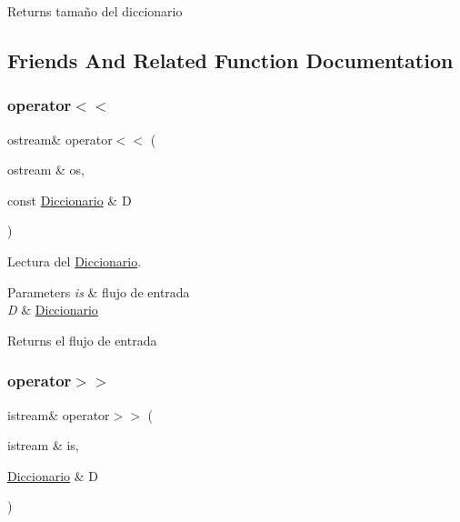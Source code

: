 \begin{DoxyReturn}{Returns}
tamaño del diccionario 
\end{DoxyReturn}


\subsection{Friends And Related Function Documentation}
\mbox{\label{classDiccionario_aad8d25118e38f63c35cfc247af45a78a}} 
\subsubsection{\texorpdfstring{operator$<$$<$}{operator<<}}
{\footnotesize\ttfamily ostream\& operator$<$$<$ (\begin{DoxyParamCaption}\item[{ostream \&}]{os,  }\item[{const \mbox{\hyperlink{classDiccionario}{Diccionario}} \&}]{D }\end{DoxyParamCaption})\hspace{0.3cm}{\ttfamily [friend]}}



Lectura del \mbox{\hyperlink{classDiccionario}{Diccionario}}. 


\begin{DoxyParams}{Parameters}
{\em is} & flujo de entrada \\
\hline
{\em D} & \mbox{\hyperlink{classDiccionario}{Diccionario}} \\
\hline
\end{DoxyParams}
\begin{DoxyReturn}{Returns}
el flujo de entrada 
\end{DoxyReturn}
\mbox{\label{classDiccionario_a940c6d9371bca891c95a5a044a42905f}} 
\subsubsection{\texorpdfstring{operator$>$$>$}{operator>>}}
{\footnotesize\ttfamily istream\& operator$>$$>$ (\begin{DoxyParamCaption}\item[{istream \&}]{is,  }\item[{\mbox{\hyperlink{classDiccionario}{Diccionario}} \&}]{D }\end{DoxyParamCaption})\hspace{0.3cm}{\ttfamily [friend]}}



